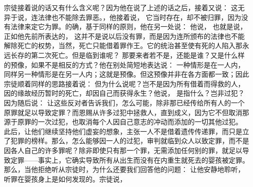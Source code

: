 宗徒接着说的话又有什么含义呢？因为他在说了上述的话之后，接着又说：  这无异于说，连法律也不能除去罪恶。，他接着说，  它当时存在，却不被归罪，因为没有法律来定它为罪。的确，基于同样的原则，他在另一处说：  他说，  也就是说，正如他先前所表达的， 这并不是说以后没有罪，而是因为连所颁布的法律也不能解除死亡的权势，当然，死亡只能借着罪作王。它的统治甚至使有死的人陷入那永远长存的第二次死亡。但是临到谁呢？  那要来者若不是，还能是谁？又是什么样的预像，如果不是相反的方式？他在别处简短地表达说：  一种情形是在一人内，同样另一种情形是在另一人内；这就是预像。但这预像并非在各方面都一致；因此宗徒顺着同样的思路接着说：  但为什么说呢？岂不是因为所有借着而得救的人，因的缘故经历暂时的死亡，却因自己而获得永生？他说，  是指什么？岂非过犯？因为随后说： 让这些反对者告诉我们，怎么可能，除非那已经传给所有人的一个原罪就足以导致定罪？而恩赐从许多过犯中拯救人，直到成义，因为它不但取消那源于原罪的一次过犯，也取消每个人因自己意志的冲动而添加的一切其他过犯。  此后，让他们继续坚持他们虚妄的想象，主张一人不是借着遗传传递罪，而只是立了犯罪的榜样。那么，怎么能够因一人的过犯，审判就临到众人以致定罪，而不是因各人自己的许多罪呢？除非即使只有那一个罪，无需添加任何别的罪，就足以导致定罪——事实上，它确实导致所有从出生而没有在内重生就死去的婴孩被定罪。那么，当他拒绝听从宗徒时，为什么还要我们回答他的问题： 让他安静地聆听，听罪在婴孩身上是如何发现的。宗徒说， 